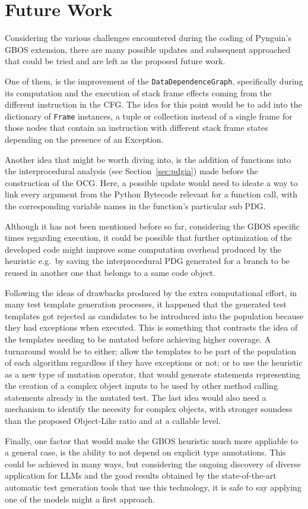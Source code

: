 \documentclass[%
  chapterprefix=false,%
  open=right,%
  twoside=true,%
  paper=a4,%
  logofile={Figures/logo.png},%
  thesistype=master,%
  UKenglish,%
]{se2thesis}
\newcommand{\classname}[1]{\texttt{#1}}
\begin{document}
\section{Future Work}

Considering the various challenges encountered during the coding of Pynguin's GBOS extension, there are many possible updates and subsequent approached that could be tried and are left as the proposed future work.

One of them, is the improvement of the \classname{DataDependenceGraph}, specifically during its computation and the execution of stack frame effects coming from the different instruction in the CFG.\@
The idea for this point would be to add into the dictionary of \classname{Frame} instances, a tuple or collection instead of a single frame for those nodes that contain an instruction with different stack frame states depending on the presence of an Exception.

Another idea that might be worth diving into, is the addition of functions into the interprocedural analysis (see Section~\ref{sec:pdgia}) made before the construction of the OCG.\@
Here, a possible update would need to ideate a way to link every argument from the Python Bytecode relevant for a function call, with the corresponding variable names in the function's particular sub PDG.\@

Although it has not been mentioned before so far, considering the GBOS specific times regarding execution, it could be possible that further optimization of the developed code might improve some computation overhead produced by the heuristic e.g.~by saving the interprocedural PDG generated for a branch to be reused in another one that belongs to a same code object.

Following the ideas of drawbacks produced by the extra computational effort, in many test template generation processes, it happened that the generated test templates got rejected as candidates to be introduced into the population because they had exceptions when executed.
This is something that contrasts the idea of the templates needing to be mutated before achieving higher coverage.
A turnaround would be to either; allow the templates to be part of the population of each algorithm regardless if they have exceptions or not; or to use the heuristic as a new type of mutation operator, that would generate statements representing the creation of a complex object inputs to be used by other method calling statements already in the mutated test.
The last idea would also need a mechanism to identify the necesity for complex objects, with stronger soundess than the proposed Object-Like ratio and at a callable level.

Finally, one factor that would make the GBOS heuristic much more appliable to a general case, is the ability to not depend on explicit type annotations.
This could be achieved in many ways, but considering the ongoing discovery of diverse application for LLMs and the good results obtained by the state-of-the-art automatic test generation tools that use this technology, it is safe to say applying one of the models might a first approach.

\backmatter{}

\printbibliography{}
\end{document}
